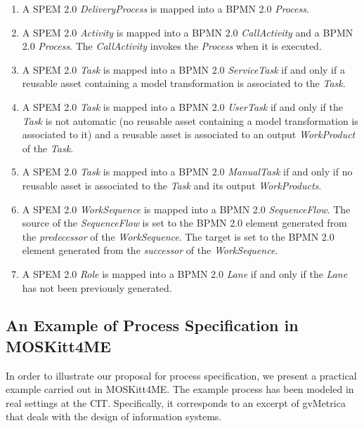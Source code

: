 \documentclass[runningheads,a4paper]{llncs}
\begin{document}
\begin{enumerate}
  \item A SPEM 2.0 \textit{DeliveryProcess} is mapped into a BPMN 2.0
  \textit{Process}.
  
  \item A SPEM 2.0 \textit{Activity} is mapped into a BPMN 2.0
  \textit{CallActivity} and a BPMN 2.0 \textit{Process}. The
  \textit{CallActivity} invokes the \textit{Process} when it is executed.
  
  \item A SPEM 2.0 \textit{Task} is mapped into a BPMN 2.0
  \textit{ServiceTask} if and only if a reusable asset containing a model
  transformation is associated to the \textit{Task}.
  
  \item A SPEM 2.0 \textit{Task} is mapped into a BPMN 2.0 \textit{UserTask}
  if and only if the \textit{Task} is not automatic (no reusable asset
  containing a model transformation is associated to it) and a reusable asset is
  associated to an output \textit{WorkProduct} of the \textit{Task}.
  
  \item A SPEM 2.0 \textit{Task} is mapped into a BPMN 2.0
  \textit{ManualTask} if and only if no reusable asset is associated to the
  \textit{Task} and its output \textit{WorkProducts}.
  
  \item A SPEM 2.0 \textit{WorkSequence} is mapped into a BPMN 2.0
  \textit{SequenceFlow}. The source of the \textit{SequenceFlow} is set to the
  BPMN 2.0 element generated from the \textit{predecessor} of the
  \textit{WorkSequence}. The target is set to the BPMN 2.0 element generated
  from the \textit{successor} of the \textit{WorkSequence}.
  
  \item A SPEM 2.0 \textit{Role} is mapped into a BPMN 2.0 \textit{Lane} if
  and only if the \textit{Lane} has not been previously generated.
\end{enumerate}

\subsection{An Example of Process Specification in MOSKitt4ME}
\label{SubsectionExample}  

In order to illustrate our proposal for process specification, we present a
practical example carried out in MOSKitt4ME. The example process has been
modeled in real settings at the CIT. Specifically, it corresponds to an excerpt
of gvMetrica that deals with the design of information systems.
\end{document}
